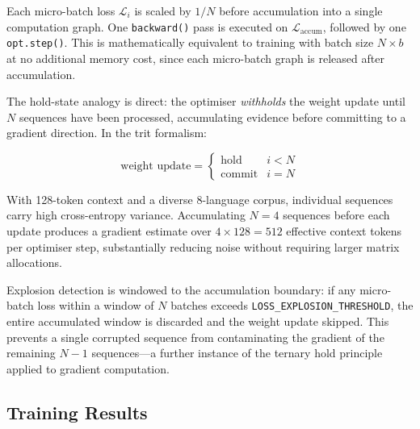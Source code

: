 \documentclass[11pt,a4paper]{article}
\begin{document}
Each micro-batch loss $\mathcal{L}_i$ is scaled by $1/N$ before accumulation into
a single computation graph. One \texttt{backward()} pass is executed on
$\mathcal{L}_{\text{accum}}$, followed by one \texttt{opt.step()}. This is
mathematically equivalent to training with batch size $N \times b$ at no additional
memory cost, since each micro-batch graph is released after accumulation.

The hold-state analogy is direct: the optimiser \emph{withholds} the weight update
until $N$ sequences have been processed, accumulating evidence before committing to
a gradient direction. In the trit formalism:

\begin{equation}
  \text{weight update} = \begin{cases}
    \text{hold}   & i < N \\
    \text{commit} & i = N
  \end{cases}
\end{equation}

With 128-token context and a diverse 8-language corpus, individual sequences carry
high cross-entropy variance. Accumulating $N=4$ sequences before each update
produces a gradient estimate over $4 \times 128 = 512$ effective context tokens
per optimiser step, substantially reducing noise without requiring larger matrix
allocations.

Explosion detection is windowed to the accumulation boundary: if any micro-batch
loss within a window of $N$ batches exceeds \texttt{LOSS\_EXPLOSION\_THRESHOLD},
the entire accumulated window is discarded and the weight update skipped. This
prevents a single corrupted sequence from contaminating the gradient of the
remaining $N-1$ sequences---a further instance of the ternary hold principle
applied to gradient computation.

\subsection{Training Results}\label{subsec:results}
\end{document}
